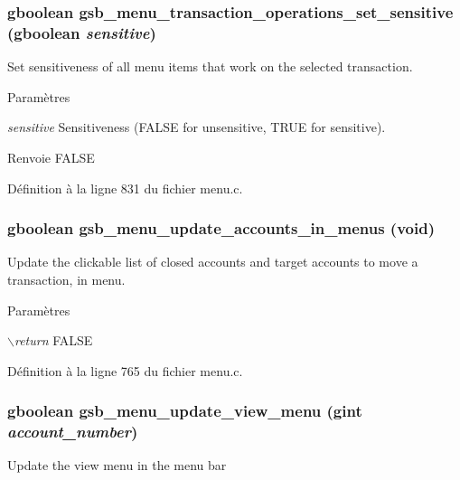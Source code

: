 \subsubsection[{gsb\_\-menu\_\-transaction\_\-operations\_\-set\_\-sensitive}]{\setlength{\rightskip}{0pt plus 5cm}gboolean gsb\_\-menu\_\-transaction\_\-operations\_\-set\_\-sensitive (gboolean {\em sensitive})}\label{menu_8h_a2cd0fa9a87d28146f743c30d75c3ee00}
Set sensitiveness of all menu items that work on the selected transaction.


\begin{DoxyParams}{Paramètres}
\item[{\em sensitive}]Sensitiveness (FALSE for unsensitive, TRUE for sensitive).\end{DoxyParams}
\begin{DoxyReturn}{Renvoie}
FALSE 
\end{DoxyReturn}


Définition à la ligne 831 du fichier menu.c.

\subsubsection[{gsb\_\-menu\_\-update\_\-accounts\_\-in\_\-menus}]{\setlength{\rightskip}{0pt plus 5cm}gboolean gsb\_\-menu\_\-update\_\-accounts\_\-in\_\-menus (void)}\label{menu_8h_a82ddd4b1a12d79cf3c8211128ef52a88}
Update the clickable list of closed accounts and target accounts to move a transaction, in menu.


\begin{DoxyParams}{Paramètres}
\item[{\em $\backslash$return}]FALSE \end{DoxyParams}


Définition à la ligne 765 du fichier menu.c.

\subsubsection[{gsb\_\-menu\_\-update\_\-view\_\-menu}]{\setlength{\rightskip}{0pt plus 5cm}gboolean gsb\_\-menu\_\-update\_\-view\_\-menu (gint {\em account\_\-number})}\label{menu_8h_a60f727414d6ce8974582d80ae95c1f81}
Update the view menu in the menu bar



